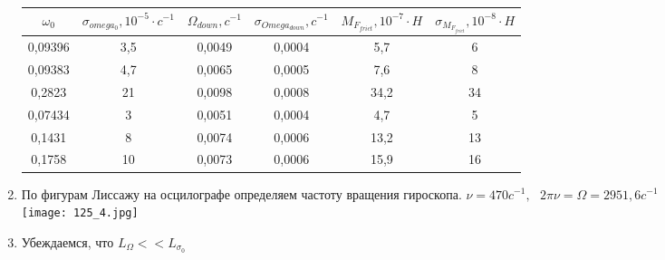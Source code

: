 \documentclass[a4paper, 12pt]{article}%
\begin{document}
\begin{enumerate}
\begin{center}
\begin{tabular}{|c|c|c|c|c|c|}
\hline
$\omega_0$ & $\sigma_{omega_0}, 10^{-5} \cdot c^{-1}$ & $\Omega_{down}, c^{-1}$ & $\sigma_{Omega_{down}}, c^{-1}$ & $M_{F_{frict}}, 10^{-7} \cdot H$ & $\sigma_{M_{F_{frict}}}, 10^{-8} \cdot H$ \\ \hline
0,09396    & 3,5                                      & 0,0049                  & 0,0004                          & 5,7                              & 6                                         \\ \hline
0,09383    & 4,7                                      & 0,0065                  & 0,0005                          & 7,6                              & 8                                         \\ \hline
0,2823     & 21                                       & 0,0098                  & 0,0008                          & 34,2                             & 34                                        \\ \hline
0,07434    & 3                                        & 0,0051                  & 0,0004                          & 4,7                              & 5                                         \\ \hline
0,1431     & 8                                        & 0,0074                  & 0,0006                          & 13,2                             & 13                                        \\ \hline
0,1758     & 10                                       & 0,0073                  & 0,0006                          & 15,9                             & 16                                        \\ \hline
\end{tabular}
\end{center}
\newpage
\item По фигурам Лиссажу на осцилографе определяем частоту вращения гироскопа. $\nu = 470 c^{-1}, \text{  } 2 \pi \nu = \Omega = 2951,6 c^{-1}$ \\
\texttt{[image: 125\_4.jpg]}
\item Убеждаемся, что $L_{\Omega} << L_{\sigma_0}$
\end{enumerate}
\end{document}
